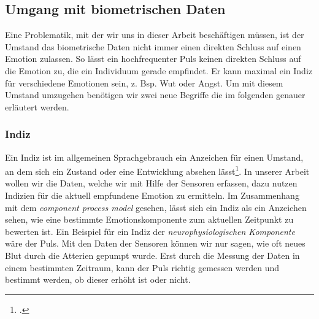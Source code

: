 \subsection{Umgang mit biometrischen Daten}
Eine Problematik, mit der wir uns in dieser Arbeit beschäftigen müssen, ist der Umstand das biometrische Daten nicht immer einen direkten Schluss auf einen Emotion zulassen. So lässt ein hochfrequenter Puls keinen direkten Schluss auf die Emotion zu, die ein Individuum gerade empfindet. Er kann maximal ein Indiz für verschiedene Emotionen sein, z. Bsp. Wut oder Angst. Um mit diesem Umstand umzugehen benötigen wir zwei neue Begriffe die im folgenden genauer erläutert werden. 
\subsubsection{Indiz}
Ein Indiz ist im allgemeinen Sprachgebrauch ein Anzeichen für einen Umstand, an dem sich ein Zustand oder eine Entwicklung absehen lässt\footcite[Vgl.][]{Dud18}. In unserer Arbeit wollen wir die Daten, welche wir mit Hilfe der Sensoren erfassen, dazu nutzen Indizien für die aktuell empfundene Emotion zu ermitteln. Im Zusammenhang mit dem \textit{component process model} gesehen, lässt sich ein Indiz als ein Anzeichen sehen, wie eine bestimmte Emotionskomponente zum aktuellen Zeitpunkt zu bewerten ist. Ein Beispiel für ein Indiz der \textit{neurophysiologischen Komponente} wäre der Puls. Mit den Daten der Sensoren können wir nur sagen, wie oft neues Blut durch die Atterien gepumpt wurde. Erst durch die Messung der Daten in einem bestimmten Zeitraum, kann der Puls richtig gemessen werden und bestimmt werden, ob dieser erhöht ist oder nicht.
